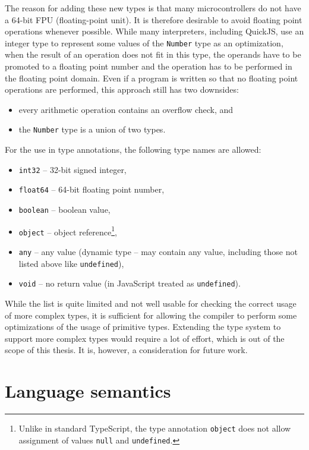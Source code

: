 The reason for adding these new types is that many microcontrollers do not have a 64-bit FPU (floating-point unit). It is therefore desirable to avoid floating point operations whenever possible. While many interpreters, including QuickJS, use an integer type to represent some values of the \texttt{Number} type as an optimization, when the result of an operation does not fit in this type, the operands have to be promoted to a floating point number and the operation has to be performed in the floating point domain. Even if a program is written so that no floating point operations are performed, this approach still has two downsides:
\begin{itemize}
    \item every arithmetic operation contains an overflow check, and
    \item the \texttt{Number} type is a union of two types.
\end{itemize}

\noindent
For the use in type annotations, the following type names are allowed:
\begin{itemize}
    \item \texttt{int32} -- 32-bit signed integer,
    \item \texttt{float64} -- 64-bit floating point number,
    \item \texttt{boolean} -- boolean value,
    \item \texttt{object} -- object reference\footnote{Unlike in standard TypeScript, the type annotation \texttt{object} does not allow assignment of values \texttt{null} and \texttt{undefined}.},
    \item \texttt{any} -- any value (dynamic type -- may contain any value, including those not listed above like \texttt{undefined}),
    \item \texttt{void} -- no return value (in JavaScript treated as \texttt{undefined}).
\end{itemize}

While the list is quite limited and not well usable for checking the correct usage of more complex types, it is sufficient for allowing the compiler to perform some optimizations of the usage of primitive types. Extending the type system to support more complex types would require a lot of effort, which is out of the scope of this thesis. It is, however, a consideration for future work.


\section{Language semantics}\label{lang:semantics}

